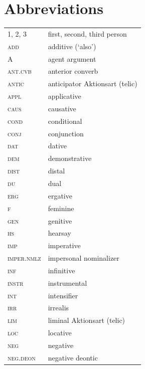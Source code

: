 \documentclass[output=paper,colorlinks,citecolor=brown,
]{langscibook}
\begin{document}
\section*{Abbreviations}
\begin{tabularx}{.55\textwidth}{@{}lQ@{}}
\textsc{1, 2, 3} & first, second, third person \\
\textsc{add} & additive (`also') \\
A & agent argument\\
\textsc{ant.cvb} & anterior converb \\
\textsc{antic} & anticipator Aktionsart (telic) \\
\textsc{appl} & applicative \\
\textsc{caus} & causative \\
\textsc{cond} & conditional \\
\textsc{conj} & conjunction \\
\textsc{dat} & dative \\
\textsc{dem} & demonstrative \\
\textsc{dist} & distal \\
\textsc{du} & dual \\
\textsc{erg} & ergative \\
\textsc{f} & feminine \\
\textsc{gen} & genitive \\
\textsc{hs} & hearsay \\
\textsc{imp} & imperative \\
\textsc{imper.nmlz} & impersonal nominalizer\\
\textsc{inf} & infinitive \\
\textsc{instr} & instrumental \\
\textsc{int} & intensifier \\
\textsc{irr} & irrealis \\
\textsc{lim} & liminal Aktionsart (telic) \\
\textsc{loc} & locative \\
\textsc{neg} & negative\\
\textsc{neg.deon} & negative deontic \\\end{tabularx}%
\end{document}
